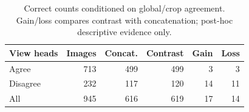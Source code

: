 \begin{table}[t]
\centering\small
\begin{tabular}{lrrrrr}
\toprule
View heads & Images & Concat. & Contrast & Gain & Loss \\
\midrule
Agree & 713 & 499 & 499 & 3 & 3 \\
Disagree & 232 & 117 & 120 & 14 & 11 \\
All & 945 & 616 & 619 & 17 & 14 \\
\bottomrule
\end{tabular}
\caption{Correct counts conditioned on global/crop agreement. Gain/loss compares contrast with concatenation; post-hoc descriptive evidence only.}
\label{tab:viewchanges}
\end{table}
